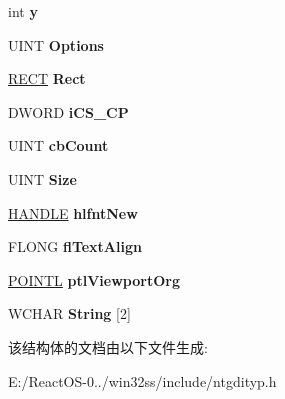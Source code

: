\begin{DoxyCompactItemize}
int {\bfseries y}
\item 
\mbox{\label{struct___g_d_i_b_s_t_e_x_t_o_u_t_a4d6d3f4cfb07bb9a3d1cab1ff246c9fc}} 
U\+I\+NT {\bfseries Options}
\item 
\mbox{\label{struct___g_d_i_b_s_t_e_x_t_o_u_t_a3d9ba0e9942f802681ee74c6cf554865}} 
\hyperlink{structtag_r_e_c_t}{R\+E\+CT} {\bfseries Rect}
\item 
\mbox{\label{struct___g_d_i_b_s_t_e_x_t_o_u_t_aff94a8186159e45ae1434be7e024df07}} 
D\+W\+O\+RD {\bfseries i\+C\+S\+\_\+\+CP}
\item 
\mbox{\label{struct___g_d_i_b_s_t_e_x_t_o_u_t_a479f1c73f51e22d05cb6de96758537c6}} 
U\+I\+NT {\bfseries cb\+Count}
\item 
\mbox{\label{struct___g_d_i_b_s_t_e_x_t_o_u_t_abf491c3d123ce45dbbc00803d5c741e4}} 
U\+I\+NT {\bfseries Size}
\item 
\mbox{\label{struct___g_d_i_b_s_t_e_x_t_o_u_t_a6086c7d5c39637af68d39c9ed23fe76c}} 
\hyperlink{interfacevoid}{H\+A\+N\+D\+LE} {\bfseries hlfnt\+New}
\item 
\mbox{\label{struct___g_d_i_b_s_t_e_x_t_o_u_t_adb93a455bdc71dd49bc07c9f6f54433c}} 
F\+L\+O\+NG {\bfseries fl\+Text\+Align}
\item 
\mbox{\label{struct___g_d_i_b_s_t_e_x_t_o_u_t_a159a4a5e0c487d7aa98043c2791f4846}} 
\hyperlink{struct___p_o_i_n_t_l}{P\+O\+I\+N\+TL} {\bfseries ptl\+Viewport\+Org}
\item 
\mbox{\label{struct___g_d_i_b_s_t_e_x_t_o_u_t_a898a47c874dc479ab478b10ac54d2836}} 
W\+C\+H\+AR {\bfseries String} \mbox{[}2\mbox{]}
\end{DoxyCompactItemize}


该结构体的文档由以下文件生成\+:\begin{DoxyCompactItemize}
\item 
E\+:/\+React\+O\+S-\/0../win32ss/include/ntgdityp.\+h\end{DoxyCompactItemize}
